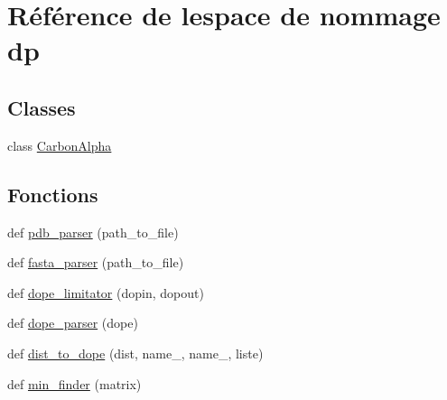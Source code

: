 \hypertarget{namespacedp}{}\section{Référence de l\textquotesingle{}espace de nommage dp}
\label{namespacedp}
\subsection*{Classes}
\begin{DoxyCompactItemize}
\item 
class \hyperlink{classdp_1_1CarbonAlpha}{Carbon\+Alpha}
\end{DoxyCompactItemize}
\subsection*{Fonctions}
\begin{DoxyCompactItemize}
\item 
def \hyperlink{namespacedp_a2efc9e97f366bbb035bcfb64e2c1d586}{pdb\+\_\+parser} (path\+\_\+to\+\_\+file)
\item 
def \hyperlink{namespacedp_a18f65f051a1b44c4c4f29a1084a1e2b5}{fasta\+\_\+parser} (path\+\_\+to\+\_\+file)
\item 
def \hyperlink{namespacedp_a3a7741f5f7d2e8023f2a1c2d35bd2fb0}{dope\+\_\+limitator} (dopin, dopout)
\item 
def \hyperlink{namespacedp_ae89d77b1b40672307f39db4453a7861a}{dope\+\_\+parser} (dope)
\item 
def \hyperlink{namespacedp_a45db1a33ee37d79569eb5dfa56bd621a}{dist\+\_\+to\+\_\+dope} (dist, name\+\_, name\+\_, liste)
\item 
def \hyperlink{namespacedp_a3f44712ec966315e39438691a4868b67}{min\+\_\+finder} (matrix)
\end{DoxyCompactItemize}

